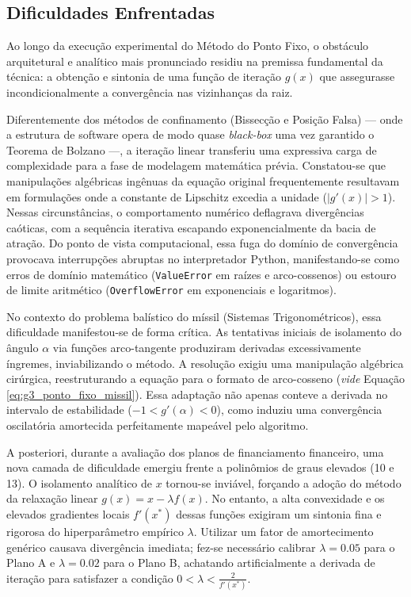 \subsection{Dificuldades Enfrentadas}
\label{subsec:dificuldades_ponto_fixo}

Ao longo da execução experimental do Método do Ponto Fixo, o obstáculo arquitetural e analítico mais pronunciado residiu na premissa fundamental da técnica: a obtenção e sintonia de uma função de iteração $g(x)$ que assegurasse incondicionalmente a convergência nas vizinhanças da raiz. 

Diferentemente dos métodos de confinamento (Bissecção e Posição Falsa) — onde a estrutura de software opera de modo quase \textit{black-box} uma vez garantido o Teorema de Bolzano —, a iteração linear transferiu uma expressiva carga de complexidade para a fase de modelagem matemática prévia. Constatou-se que manipulações algébricas ingênuas da equação original frequentemente resultavam em formulações onde a constante de Lipschitz excedia a unidade ($|g'(x)| > 1$). Nessas circunstâncias, o comportamento numérico deflagrava divergências caóticas, com a sequência iterativa escapando exponencialmente da bacia de atração. Do ponto de vista computacional, essa fuga do domínio de convergência provocava interrupções abruptas no interpretador Python, manifestando-se como erros de domínio matemático (\texttt{ValueError} em raízes e arco-cossenos) ou estouro de limite aritmético (\texttt{OverflowError} em exponenciais e logaritmos).

No contexto do problema balístico do míssil (Sistemas Trigonométricos), essa dificuldade manifestou-se de forma crítica. As tentativas iniciais de isolamento do ângulo $\alpha$ via funções arco-tangente produziram derivadas excessivamente íngremes, inviabilizando o método. A resolução exigiu uma manipulação algébrica cirúrgica, reestruturando a equação para o formato de arco-cosseno (\textit{vide} Equação \ref{eq:g3_ponto_fixo_missil}). Essa adaptação não apenas conteve a derivada no intervalo de estabilidade ($-1 < g'(\alpha) < 0$), como induziu uma convergência oscilatória amortecida perfeitamente mapeável pelo algoritmo.

A posteriori, durante a avaliação dos planos de financiamento financeiro, uma nova camada de dificuldade emergiu frente a polinômios de graus elevados (10 e 13). O isolamento analítico de $x$ tornou-se inviável, forçando a adoção do método da relaxação linear $g(x) = x - \lambda f(x)$. No entanto, a alta convexidade e os elevados gradientes locais $f'(x^*)$ dessas funções exigiram um sintonia fina e rigorosa do hiperparâmetro empírico $\lambda$. Utilizar um fator de amortecimento genérico causava divergência imediata; fez-se necessário calibrar $\lambda = 0.05$ para o Plano A e $\lambda = 0.02$ para o Plano B, achatando artificialmente a derivada de iteração para satisfazer a condição $0 < \lambda < \frac{2}{f'(x^*)}$.

